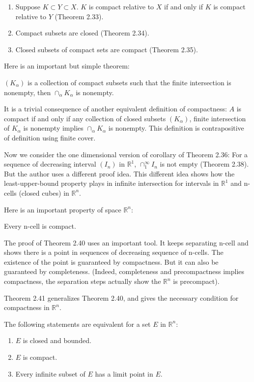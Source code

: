 \begin{enumerate}
    \item Suppose $K\subset Y\subset X$. $K$ is compact relative to $X$ if and only if $K$ is compact relative to $Y$ (Theorem 2.33). 
    \item Compact subsets are closed (Theorem 2.34).
    \item Closed subsets of compact sets are compact (Theorem 2.35).
\end{enumerate}
Here is an important but simple theorem:
\begin{theorem}[Theorem 2.36]
    $(K_\alpha)$ is a collection of compact subsets such that the finite intersection is nonempty, then $\cap_\alpha K_\alpha$ is nonempty.
\end{theorem}
It is a trivial consequence of another equivalent definition of compactness: $A$ is compact if and only if any collection of closed subsets $(K_\alpha)$, finite intersection of $K_\alpha$ is nonempty implies $\cap_\alpha K_\alpha$ is nonempty. This definition is contrapositive of definition using finite cover.\par
Now we consider the one dimensional version of corollary of Theorem 2.36: For a sequence of decreasing interval $(I_n)$ in $\mathbb{R}^1$, $\cap_1^{\infty}I_n$ is not empty (Theorem 2.38). But the author uses a different proof idea. This different idea shows how the least-upper-bound property plays in infinite intersection for intervals in $\mathbb{R}^1$ and n-cells (closed cubes) in $\mathbb{R}^n$.\par
Here is an important property of space $\mathbb{R}^n$:
\begin{theorem}[Theorem 2.40]
    Every n-cell is compact.
\end{theorem}
The proof of Theorem 2.40 uses an important tool. It keeps separating n-cell and shows there is a point in sequences of decreasing sequence of n-cells. The existence of the point is guaranteed by compactness. But it can also be guaranteed by completeness. (Indeed, completeness and precompactness implies compactness, the separation steps  actually show the $\mathbb{R}^n$ is precompact).\par
Theorem 2.41 generalizes Theorem 2.40, and gives the necessary condition for compactness in $\mathbb{R}^n$.
\begin{theorem}
    The following statements are equivalent for a set $E$ in $\mathbb{R}^n$:
    \begin{enumerate}
        \item $E$ is closed and bounded.
        \item $E$ is compact.
        \item Every infinite subset of $E$ has a limit point in $E$.
    \end{enumerate}
\end{theorem}
